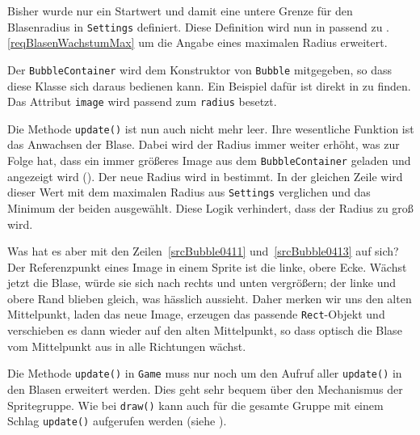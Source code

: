 
Bisher wurde nur ein Startwert und damit eine untere Grenze für den Blasenradius in \texttt{Settings} definiert. Diese Definition wird nun in  passend zu .\ref{reqBlasenWachstumMax} um die Angabe eines maximalen Radius erweitert.


Der \texttt{BubbleContainer} wird dem Konstruktor von \texttt{Bubble} mitgegeben, so dass diese Klasse sich daraus bedienen kann. Ein Beispiel dafür ist direkt in  zu finden. Das Attribut \texttt{image} wird passend zum \texttt{radius} besetzt.

Die Methode \texttt{update()} ist nun auch nicht mehr leer. Ihre wesentliche Funktion ist das Anwachsen der Blase. Dabei wird der Radius immer weiter erhöht, was zur Folge hat, dass ein immer größeres Image aus dem \texttt{BubbleContainer} geladen und angezeigt wird (). Der neue Radius wird in  bestimmt. In der gleichen Zeile wird dieser Wert mit dem maximalen Radius aus \texttt{Settings} verglichen und das Minimum der beiden ausgewählt. Diese Logik verhindert, dass der Radius zu groß wird.

Was hat es aber mit den Zeilen~\ref{srcBubble0411} und~\ref{srcBubble0413} auf sich? Der Referenzpunkt eines Image in einem Sprite ist die linke, obere Ecke. Wächst jetzt die Blase, würde sie sich nach rechts und unten vergrößern; der linke und obere Rand blieben gleich, was hässlich aussieht. Daher merken wir uns den alten Mittelpunkt, laden das neue Image, erzeugen das passende \texttt{Rect}-Objekt und verschieben es dann wieder auf den alten Mittelpunkt, so dass optisch die Blase vom Mittelpunkt aus in alle Richtungen wächst.


Die Methode \texttt{update()} in \texttt{Game} muss nur noch um den Aufruf aller \texttt{update()} in den Blasen erweitert werden. Dies geht sehr bequem über den Mechanismus der Spritegruppe. Wie bei \texttt{draw()} kann auch für die gesamte Gruppe mit einem Schlag \texttt{update()} aufgerufen werden (siehe ).

